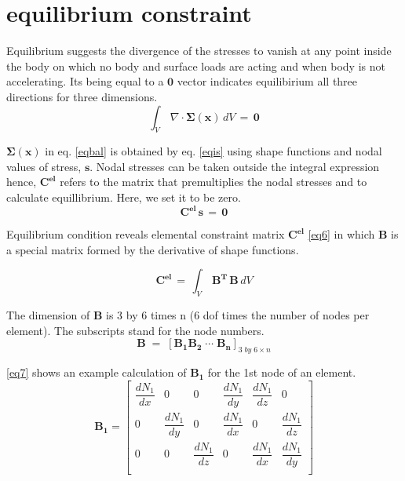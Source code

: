 \documentclass{article}
\begin{document}
\section{equilibrium constraint}
Equilibrium suggests the divergence of the stresses to vanish at any point inside the body on which no body and surface loads are acting and when body is not accelerating. Its being equal to a $\mathbf{0}$ vector indicates equilibirium all three directions for three dimensions.
\begin{equation}
\int _V\, \nabla\cdot\mathbf{\Sigma(x)}\, dV \,=\, \mathbf{0}
\label{eqbal}
\end{equation}

$\mathbf{\Sigma(x)}$ in eq. \eqref{eqbal} is obtained by eq. \eqref{eqis} using shape functions and nodal values of stress, $\mathbf{s}$. Nodal stresses can be taken outside the integral expression hence, $\mathbf{C^{el}}$ refers to the matrix that premultiplies the nodal stresses and to calculate equillibrium. Here, we set it to be zero.
\begin{equation}
\mathbf{C^{el}}\, \mathbf{s} \,=\, \mathbf{0}
\label{eqbal1}
\end{equation}

Equilibrium condition reveals elemental constraint matrix $\mathbf{C^{el}}$ \eqref{eq6} in which $\mathbf{B}$ is a special matrix formed by the derivative of shape functions.



\begin{equation}
\mathbf{C^{el}} \,=\,  \int _V  \, \mathbf{B^T} \, \mathbf{B} \, dV
\label{eq6}
\end{equation}


The dimension of $\mathbf{B}$ is 3 by 6 times n (6 dof times the number of nodes per element). The subscripts stand for the node numbers.
\begin{equation}
\mathbf{B} \;=\; \left[ \mathbf{B_1} \mathbf{B_2} \; \cdots\; \mathbf{B_n}  \right]_{3\; by\; 6\times n}
\end{equation}


\eqref{eq7} shows an example calculation of $\mathbf{B_1}$ for the 1st node of an element.
\begin{equation}
\mathbf{B_1} = \left[{ \begin{array}{cccccc}
		\dfrac{dN_1}{dx} & 0 & 0 & \dfrac{dN_1}{dy} & \dfrac{dN_1}{dz} & 0 \\
		0 & \dfrac{dN_1}{dy} & 0 & \dfrac{dN_1}{dx} & 0 & \dfrac{dN_1}{dz} \\
		0 & 0 & \dfrac{dN_1}{dz} & 0 & \dfrac{dN_1}{dx} & \dfrac{dN_1}{dy} \\
\end{array}} \right]
\label{eq7}
\end{equation}
\end{document}
